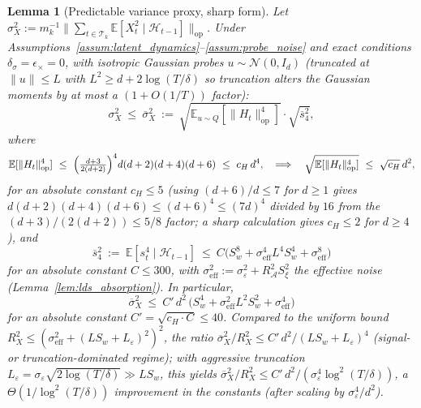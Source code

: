 \documentclass[11pt]{article}
\newcommand{\E}{\mathbb{E}}
\newcommand{\op}{\mathrm{op}}
\newcommand{\cA}{\mathcal{A}}
\newcommand{\cH}{\mathcal{H}}
\newcommand{\cT}{\mathcal{T}}
\newtheorem{lemma}{Lemma}
\begin{document}
\begin{lemma}[Predictable variance proxy, sharp form]
\label{lem:variance_proxy}
Let $\sigma_X^2:=m_k^{-1}\bigl\|\sum_{t\in\cT_k}\E[X_t^2\mid\cH_{t-1}]\bigr\|_{\op}$.
Under Assumptions~\ref{assum:latent_dynamics}--\ref{assum:probe_noise} and
exact conditions $\delta_\sigma=\epsilon_\times=0$, with isotropic Gaussian
probes $u\sim\mathcal N(0,I_d)$ (truncated at $\|u\|\le L$ with
$L^2\ge d+2\log(T/\delta)$ so truncation alters the Gaussian moments by at
most a $(1+O(1/T))$ factor):
\begin{equation}
  \sigma_X^2\ \le\ \overline{\sigma}_X^2
  \ :=\ \sqrt{\mathbb E_{u\sim Q}[\|H_t\|_{\op}^4]}\cdot
  \sqrt{\overline s_4^2},
  \label{eq:sigmabar_sharp}
\end{equation}
where
\[
  \mathbb E[\|H_t\|_{\op}^4]\ \le\ \Bigl(\tfrac{d+3}{2(d+2)}\Bigr)^4 d(d+2)(d+4)(d+6)\ \le\ c_H\,d^4,
  \quad\Longrightarrow\quad
  \sqrt{\mathbb E[\|H_t\|_{\op}^4]}\ \le\ \sqrt{c_H}\,d^2,
\]
for an absolute constant $c_H\le 5$ (using $(d+6)/d\le 7$ for $d\ge 1$ gives
$d(d+2)(d+4)(d+6)\le(d+6)^4\le(7d)^4$ divided by $16$ from the $(d+3)/(2(d+2))\le 5/8$
factor; a sharp calculation gives $c_H\le 2$ for $d\ge 4$),
and
\[
  \overline s_4^2\ :=\ \mathbb E[s_t^4\mid\cH_{t-1}]
  \ \le\ C\bigl(S_w^8+\sigma_{\mathrm{eff}}^4 L^4 S_w^4+\sigma_{\mathrm{eff}}^8\bigr)
\]
for an absolute constant $C\le 300$, with $\sigma_{\mathrm{eff}}^2:=\sigma_\varepsilon^2+R_\cA^2 S_\xi^2$
the effective noise (Lemma~\ref{lem:lds_absorption}).  In particular,
\begin{equation}
  \overline\sigma_X^2\ \le\ C'\,d^2\,
  \bigl(S_w^4+\sigma_{\mathrm{eff}}^2 L^2 S_w^2+\sigma_{\mathrm{eff}}^4\bigr)
  \label{eq:sigmabar_sharp_final}
\end{equation}
for an absolute constant $C'=\sqrt{c_H\cdot C}\le 40$.  Compared to the
uniform bound $R_X^2\le(\sigma_{\mathrm{eff}}^2+(LS_w+L_\varepsilon)^2)^2$, the
ratio $\overline\sigma_X^2/R_X^2\le C'\,d^2/(LS_w+L_\varepsilon)^4$ (signal- or
truncation-dominated regime); with aggressive truncation
$L_\varepsilon=\sigma_\varepsilon\sqrt{2\log(T/\delta)}\gg LS_w$, this yields
$\overline\sigma_X^2/R_X^2\le C'\,d^2/(\sigma_\varepsilon^4\log^2(T/\delta))$,
a $\Theta(1/\log^2(T/\delta))$ improvement in the constants
(after scaling by $\sigma_\varepsilon^4/d^2$).
\end{lemma}
\end{document}
